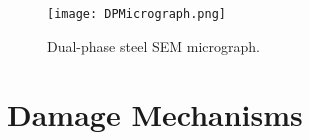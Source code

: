 \begin{figure}[H]
\centering
  \texttt{[image: DPMicrograph.png]}
  \caption{Dual-phase steel SEM micrograph.}
  \label{fig:DPMicrostructure}
\end{figure}

\section{Damage Mechanisms}



 





